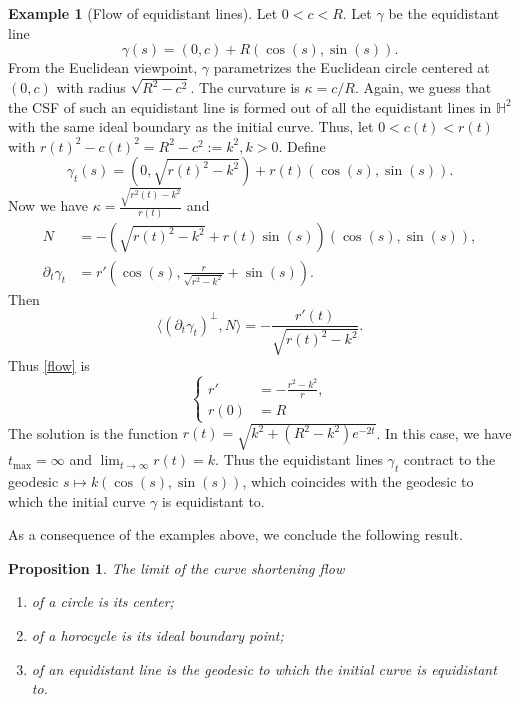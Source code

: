 \documentclass[12pt]{amsart}
\theoremstyle{plain}
\newtheorem{proposition}[theorem]{Proposition}
\theoremstyle{definition}
\newtheorem{example}[theorem]{Example}
\def\h{\mathbb H}
\begin{document}
\begin{example}[Flow of equidistant lines]
\label{ex:circle3}
Let $0<c<R$. Let $\gamma$ be the equidistant line 
$$\gamma(s)=(0,c)+R\left( \cos(s), \sin(s)\right).$$
From the Euclidean viewpoint, $\gamma$ parametrizes the Euclidean circle centered at $(0,c)$ with radius $\sqrt{R^2-c^2}$. The   curvature is $\kappa=c/R$. Again, we guess that the CSF of such  an equidistant line is formed out of all the equidistant lines in $\h^2$ with the same ideal boundary as the initial curve. Thus, let  $0<c(t)<r(t)$ with $r(t)^2-c(t)^2=R^2-c^2:=k^2,$$k>0$. Define
 $$\gamma_t(s) = (0,\sqrt{r(t)^2-k^2})+r(t)(\cos(s),  \sin(s)).$$ 
 Now we have $\kappa=\frac{\sqrt{r^2(t)-k^2}}{r(t)}$ and  
 \begin{equation*}
 \begin{split}
 N&=-(\sqrt{r(t)^2-k^2}+r(t)\sin(s))(\cos(s),\sin(s)),\\
 \partial_t\gamma_t&=r'(\cos(s),\frac{r}{\sqrt{r^2-k^2}}+\sin(s)).
 \end{split}
 \end{equation*}
  Then
 $$\langle( \partial_t\gamma_t)^\perp,N\rangle=-\frac{r'(t)}{\sqrt{r(t)^2-k^2}}.$$
 Thus \eqref{flow} is 
 \begin{equation*}
 \left\{
 \begin{split}
r'&= -\frac{r^2-k^2}{r},\\
   r(0) &= R \end{split}
   \right.
   \end{equation*}
    The solution   is the function $r(t) = \sqrt{k^2+(R^2-k^2)e^{-2t}}$.
  In this case, we have  $t_{\text{max}} =\infty$ and $\lim_{t\to\infty}r(t)=k$. Thus the equidistant lines $\gamma_t$  contract to the geodesic $s\mapsto k(\cos(s),\sin(s))$, which coincides with the geodesic to which the initial curve $\gamma$ is equidistant to.  
\end{example} 

As a consequence of the examples above, we conclude the following result. 

\begin{proposition}
The limit of the curve shortening flow   
\begin{enumerate}
\item of a  circle is its center;
\item of a horocycle is its ideal boundary point;
\item of an equidistant line is the geodesic to which the initial curve is equidistant to.
\end{enumerate}
\end{proposition}
\end{document}
